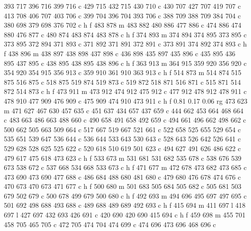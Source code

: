 {{        393 717 396 716 399 716 c
        429 715 432 715 430 710 c
        430 707 427 707 419 707 c
        413 708 406 707 403 706 c
        399 704 396 704 393 706 c
        388 709 388 709 384 704 c
        380 698 379 698 376 702 c
        h f
        483 878 m
        483 882 480 886 477 886 c
        474 886 474 880 476 877 c
        480 874 483 874 483 878 c
        h f
        374 893 m
        374 894 374 895 373 895 c
        373 895 372 894 371 893 c
        371 892 371 891 372 891 c
        373 891 374 892 374 893 c
        h f
        438 896 m
        438 897 438 898 437 898 c
        436 898 435 897 435 896 c
        435 895 436 895 437 895 c
        438 895 438 895 438 896 c
        h f
        363 913 m
        364 915 359 920 356 920 c
        354 920 354 915 356 913 c
        359 910 361 910 363 913 c
        h f
        514 873 m
        514 874 515 875 516 875 c
        518 875 519 874 519 873 c
        519 872 518 871 516 871 c
        515 871 514 872 514 873 c
        h f
        473 911 m
        473 912 474 912 475 912 c
        477 912 478 912 478 911 c
        478 910 477 909 476 909 c
        475 909 474 910 473 911 c
        h f
        0.81 0.17 0.06 rg
        473 623 m
        471 627 467 630 457 635 c
        451 637 434 657 437 659 c
        444 662 453 664 468 664 c
        483 663 486 663 488 660 c
        490 658 491 658 492 659 c
        494 661 496 662 498 662 c
        500 662 505 663 509 664 c
        517 667 519 667 521 661 c
        522 658 525 655 529 654 c
        535 651 539 647 536 644 c
        536 644 533 643 530 643 c
        528 643 526 642 526 641 c
        529 628 528 625 525 622 c
        520 618 510 619 501 623 c
        494 627 491 626 486 622 c
        479 617 475 618 473 623 c
        h f
        533 673 m
        531 681 531 682 535 678 c
        538 676 539 673 538 672 c
        537 668 534 668 533 673 c
        h f
        471 677 m
        472 678 473 682 473 685 c
        473 690 473 690 477 688 c
        486 684 488 680 481 680 c
        479 680 476 678 474 676 c
        470 673 470 673 471 677 c
        h f
        500 680 m
        501 683 505 684 505 682 c
        505 681 503 679 502 679 c
        500 678 499 679 500 680 c
        h f
        492 693 m
        494 696 495 697 497 695 c
        501 692 498 688 493 688 c
        489 688 489 689 492 693 c
        h f
        415 694 m
        411 697 l
        418 697 l
        427 697 432 693 426 691 c
        420 690 420 690 415 694 c
        h f
        459 698 m
        455 701 458 705 465 705 c
        472 705 474 704 474 699 c
        474 696 473 696 468 696 c
}}
